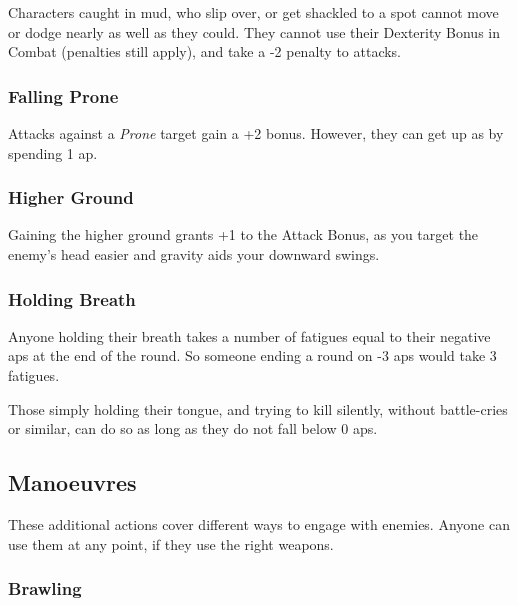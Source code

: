 \begin{multicols}{2}
Characters caught in mud, who slip over, or get shackled to a spot cannot move or dodge nearly as well as they could.
They cannot use their Dexterity Bonus in Combat (penalties still apply), and take a -2 penalty to attacks.

\subsubsection[Falling Prone: -2 penalty when on the ground]{Falling Prone}
\label{prone}

Attacks against a \textit{Prone} target gain a +2 bonus.
However, they can get up as by spending 1 \gls{ap}.

\subsubsection[+1 to attack]{Higher Ground}

Gaining the higher ground grants +1 to the Attack Bonus, as you target the enemy's head easier and gravity aids your downward swings.

\subsubsection[Holding Breath: 1 \glsentrytext{fatigue} per negative \glsentrytext{ap} at the end of the round]{Holding Breath}

Anyone holding their breath takes a number of \glspl{fatigue} equal to their negative \glspl{ap} at the end of the round.
So someone ending a round on -3 \glspl{ap} would take 3 \glspl{fatigue}.

Those simply holding their tongue, and trying to kill silently, without battle-cries or similar, can do so as long as they do not fall below 0 \glspl{ap}.

\subsection{Manoeuvres}

These additional actions cover different ways to engage with enemies.
Anyone can use them at any point, if they use the right weapons.

\subsubsection[Brawling: Make a normal attack roll, but any attack with a Margin less than 5 only inflicts \glspl{fatigue} rather than Damage]{Brawling}


\end{multicols}
